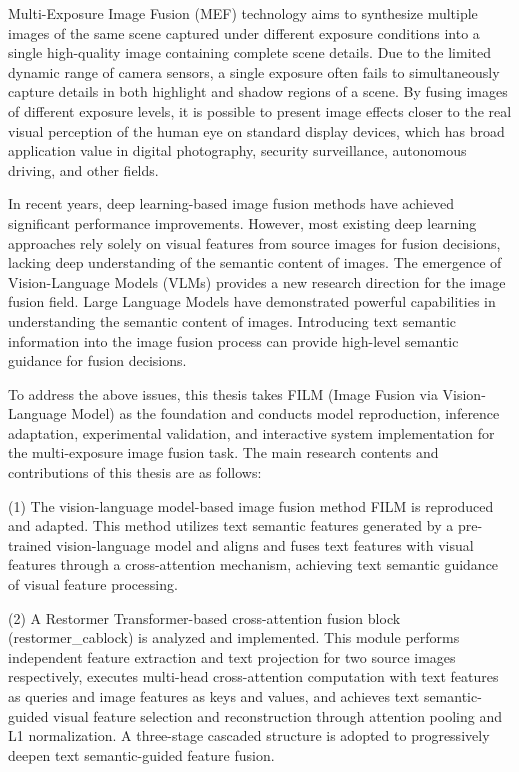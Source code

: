 \newcommand{\keywordsEn}[1][Image Fusion; Multi-Exposure Fusion; Vision-Language Model; Deep Learning; Cross-Attention Mechanism; Restormer]{#1}
\begin{abstractEn}
\noindent\hspace*{1em}Multi-Exposure Image Fusion (MEF) technology aims to synthesize multiple images of the same scene captured under different exposure conditions into a single high-quality image containing complete scene details. Due to the limited dynamic range of camera sensors, a single exposure often fails to simultaneously capture details in both highlight and shadow regions of a scene. By fusing images of different exposure levels, it is possible to present image effects closer to the real visual perception of the human eye on standard display devices, which has broad application value in digital photography, security surveillance, autonomous driving, and other fields.

In recent years, deep learning-based image fusion methods have achieved significant performance improvements. However, most existing deep learning approaches rely solely on visual features from source images for fusion decisions, lacking deep understanding of the semantic content of images. The emergence of Vision-Language Models (VLMs) provides a new research direction for the image fusion field. Large Language Models have demonstrated powerful capabilities in understanding the semantic content of images. Introducing text semantic information into the image fusion process can provide high-level semantic guidance for fusion decisions.

To address the above issues, this thesis takes FILM (Image Fusion via Vision-Language Model) as the foundation and conducts model reproduction, inference adaptation, experimental validation, and interactive system implementation for the multi-exposure image fusion task. The main research contents and contributions of this thesis are as follows:

(1) The vision-language model-based image fusion method FILM is reproduced and adapted. This method utilizes text semantic features generated by a pre-trained vision-language model and aligns and fuses text features with visual features through a cross-attention mechanism, achieving text semantic guidance of visual feature processing.

(2) A Restormer Transformer-based cross-attention fusion block (restormer\_cablock) is analyzed and implemented. This module performs independent feature extraction and text projection for two source images respectively, executes multi-head cross-attention computation with text features as queries and image features as keys and values, and achieves text semantic-guided visual feature selection and reconstruction through attention pooling and L1 normalization. A three-stage cascaded structure is adopted to progressively deepen text semantic-guided feature fusion.


\end{abstractEn}
